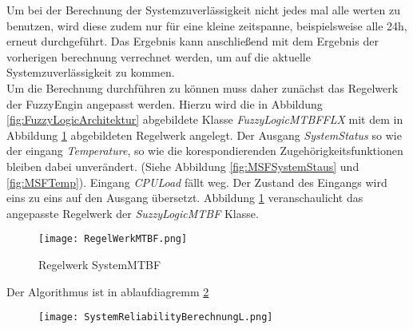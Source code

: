 Um bei der Berechnung der Systemzuverlässigkeit nicht jedes mal alle werten zu benutzen, wird diese zudem nur für eine kleine zeitspanne, beispielsweise alle 24h, erneut durchgeführt. Das Ergebnis kann anschließend mit dem Ergebnis der vorherigen berechnung verrechnet werden, um auf die aktuelle Systemzuverlässigkeit zu kommen.\\
Um die Berechnung durchführen zu können muss daher zunächst das Regelwerk der FuzzyEngin angepasst werden. Hierzu wird die in Abbildung \ref{fig:FuzzyLogicArchitektur} abgebildete Klasse \textit{FuzzyLogicMTBFFLX} mit dem in Abbildung \ref{fig:SystemMTBF} abgebildeten Regelwerk angelegt. Der Ausgang \textit{SystemStatus} so wie der eingang \textit{Temperature}, so wie die korespondierenden Zugehörigkeitsfunktionen bleiben dabei unverändert. (Siehe Abbildung \ref{fig:MSFSystemStaus} und \ref{fig:MSFTemp}). Eingang \textit{CPULoad} fällt weg. Der Zustand des Eingangs wird eins zu eins auf den Ausgang übersetzt. Abbildung \ref{fig:SystemMTBF} veranschaulicht das angepasste Regelwerk der \textit{SuzzyLogicMTBF} Klasse.
\begin{center}
    \begin{figure}[h!]
        \centering
        \texttt{[image: RegelWerkMTBF.png]}
        \caption{Regelwerk SystemMTBF}
        \label{fig:SystemMTBF}
    \end{figure}
\end{center}
\vspace{-0.5cm}

Der Algorithmus ist in ablaufdiagremm \ref{}
\begin{center}
    \begin{figure}[h!]
        \centering
        \texttt{[image: SystemReliabilityBerechnungL.png]}
        \caption{}
        \label{}
    \end{figure}
\end{center}
\vspace{-0.5cm}


